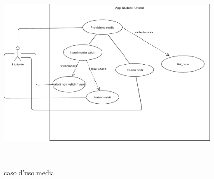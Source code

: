 \begin{figure}[H]
	\centering
	\includegraphics[height=4in]{imgs/gruppo3/caso-duso-media.pdf}
	\caption{caso d'uso media}
	\label{fig:prova}
\end{figure}

